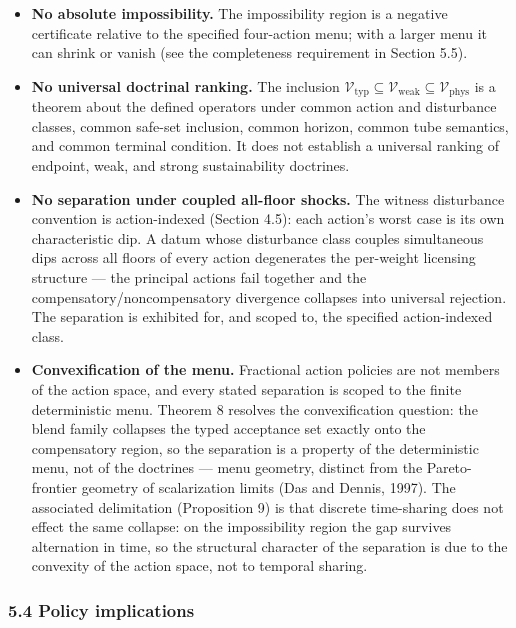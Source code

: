 \documentclass[11pt]{article}
\begin{document}
\begin{itemize}
  object, and the witness's reserve stock is excluded from the weighted aggregate by construction (Section 4.5), not by consequence of aggregation.
\item
  \textbf{No absolute impossibility.} The impossibility region is a negative certificate relative to the specified four-action menu; with a larger menu it can shrink or vanish (see the completeness requirement in Section 5.5).
\item
  \textbf{No universal doctrinal ranking.} The inclusion
  \(\mathcal{V}_{\mathrm{typ}} \subseteq \mathcal{V}_{\mathrm{weak}} \subseteq \mathcal{V}_{\mathrm{phys}}\)
  is a theorem about the defined operators under common action and
  disturbance classes, common safe-set inclusion, common horizon, common
  tube semantics, and common terminal condition. It does not establish a
  universal ranking of endpoint, weak, and strong sustainability
  doctrines.
\item
  \textbf{No separation under coupled all-floor shocks.} The witness
  disturbance convention is action-indexed (Section 4.5): each action's
  worst case is its own characteristic dip. A datum whose disturbance
  class couples simultaneous dips across all floors of every action
  degenerates the per-weight licensing structure --- the principal
  actions fail together and the compensatory/noncompensatory divergence
  collapses into universal rejection. The separation is exhibited for, and scoped to, the specified action-indexed class.
\item
  \textbf{Convexification of the menu.} Fractional action policies are
  not members of the action space, and every stated separation is scoped
  to the finite deterministic menu. Theorem 8 resolves the convexification question: the blend family collapses the typed acceptance set exactly onto the compensatory
  region, so the separation is a property of the deterministic menu, not
  of the doctrines --- menu geometry, distinct from the Pareto-frontier
  geometry of scalarization limits (Das and Dennis, 1997). The
  associated delimitation (Proposition 9) is that discrete time-sharing
  does not effect the same collapse: on the impossibility region the gap
  survives alternation in time, so the structural character of the separation is due to the convexity of the action space, not to temporal sharing.
\end{itemize}

\subsubsection{5.4 Policy implications}\label{policy-implications}
\end{document}
